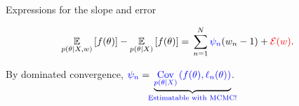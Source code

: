     

\begin{frame}[t]{Expressions for the slope and error}

%
\begin{align*}
\expect{p(\theta \vert \xvec, \w)}{f(\theta)} -
    \expect{p(\theta \vert \xvec)}{f(\theta)} ={}&
    \sumn \blue{\infl_n} (\w_n - 1) +
    \red{\err(\w)}.
%
\end{align*}       
%

\pause

By dominated convergence,
%
%
$
\blue{\infl_n} ={}
\undernote{\blue{
    \cov{\p(\theta \vert \xvec)}{ f(\theta), \ell_n(\theta)}
}}{\blue{\substack{
    \text{Estimatable with MCMC!} \\
}}}
$.


\end{frame}
